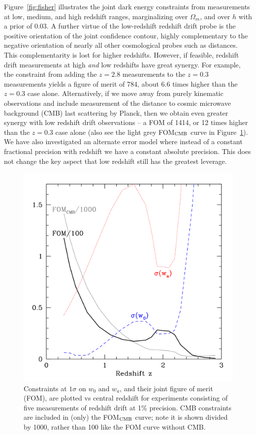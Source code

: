 \documentclass[preprint2, 10pt]{aastex}
\newcommand{\om}{\Omega_m}
\begin{document}
Figure~\ref{fig:fisher} illustrates the joint dark energy constraints 
from measurements at low, medium, and high redshift ranges, 
marginalizing over $\om$, and over $h$ with a prior of $0.03$. 
A further virtue 
of the low-redshift redshift drift probe is the positive orientation of 
the joint confidence contour, highly complementary to the negative orientation 
of nearly all other cosmological probes such as distances. This 
complementarity is lost for higher redshifts. However, if feasible, redshift 
drift measurements at high {\it and\/} low redshifts have great synergy. 
For example, the constraint from adding the $z=2.8$ measurements to the 
$z=0.3$ measurements yields a figure of merit of 784, about 6.6 times 
higher than the $z=0.3$ case alone. Alternatively, if we move away from 
purely kinematic observations and include measurement of the distance to 
cosmic microwave background (CMB) last scattering by Planck, then we obtain 
even greater synergy with low redshift drift observations -- a FOM of 1414, 
or 12 times higher than the $z=0.3$ case alone (also see the light grey 
FOM$_{\rm CMB}$ curve in Figure~\ref{fig:fom}). 
We have also investigated an alternate error model where 
instead of a constant fractional precision with redshift we have a constant 
absolute precision. This does not change the key aspect that low 
redshift still has the greatest leverage. 


\begin{figure}[!htbp] 
   \centering
  \includegraphics[width=\columnwidth]{fomcmb.pdf}
\caption{Constraints at $1\sigma$ on $w_0$ and $w_a$, and their joint 
figure of merit (FOM), are plotted vs central redshift for experiments 
consisting of five measurements of redshift drift at 1\% precision. 
CMB constraints are included in (only) the FOM$_{\rm CMB}$ curve; 
note it is shown divided by 1000, rather than 100 like 
the FOM curve without CMB. 
} 
\label{fig:fom} 
\end{figure}
\end{document}
